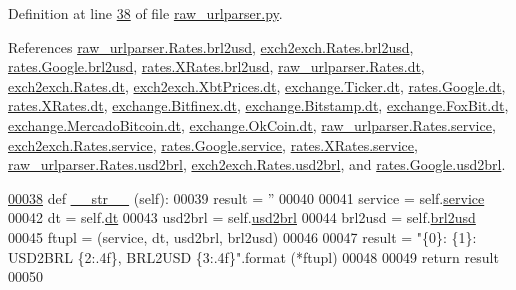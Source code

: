 Definition at line \hyperlink{raw__urlparser_8py_source_l00038}{38} of file \hyperlink{raw__urlparser_8py_source}{raw\+\_\+urlparser.\+py}.



References \hyperlink{raw__urlparser_8py_source_l00026}{raw\+\_\+urlparser.\+Rates.\+brl2usd}, \hyperlink{exch2exch_8py_source_l00030}{exch2exch.\+Rates.\+brl2usd}, \hyperlink{rates_8py_source_l00092}{rates.\+Google.\+brl2usd}, \hyperlink{rates_8py_source_l00147}{rates.\+X\+Rates.\+brl2usd}, \hyperlink{raw__urlparser_8py_source_l00024}{raw\+\_\+urlparser.\+Rates.\+dt}, \hyperlink{exch2exch_8py_source_l00028}{exch2exch.\+Rates.\+dt}, \hyperlink{exch2exch_8py_source_l00057}{exch2exch.\+Xbt\+Prices.\+dt}, \hyperlink{exchange_8py_source_l00057}{exchange.\+Ticker.\+dt}, \hyperlink{rates_8py_source_l00089}{rates.\+Google.\+dt}, \hyperlink{rates_8py_source_l00145}{rates.\+X\+Rates.\+dt}, \hyperlink{exchange_8py_source_l00338}{exchange.\+Bitfinex.\+dt}, \hyperlink{exchange_8py_source_l00407}{exchange.\+Bitstamp.\+dt}, \hyperlink{exchange_8py_source_l00471}{exchange.\+Fox\+Bit.\+dt}, \hyperlink{exchange_8py_source_l00541}{exchange.\+Mercado\+Bitcoin.\+dt}, \hyperlink{exchange_8py_source_l00606}{exchange.\+Ok\+Coin.\+dt}, \hyperlink{raw__urlparser_8py_source_l00027}{raw\+\_\+urlparser.\+Rates.\+service}, \hyperlink{exch2exch_8py_source_l00031}{exch2exch.\+Rates.\+service}, \hyperlink{rates_8py_source_l00094}{rates.\+Google.\+service}, \hyperlink{rates_8py_source_l00149}{rates.\+X\+Rates.\+service}, \hyperlink{raw__urlparser_8py_source_l00025}{raw\+\_\+urlparser.\+Rates.\+usd2brl}, \hyperlink{exch2exch_8py_source_l00029}{exch2exch.\+Rates.\+usd2brl}, and \hyperlink{rates_8py_source_l00091}{rates.\+Google.\+usd2brl}.


\begin{DoxyCode}
\hypertarget{classraw__urlparser_1_1_rates.tex_l00038}{}\hyperlink{classraw__urlparser_1_1_rates_a3e8a9922ba7e95bd54945c87d07e5f0e}{00038}     \textcolor{keyword}{def }\hyperlink{classraw__urlparser_1_1_rates_a3e8a9922ba7e95bd54945c87d07e5f0e}{\_\_str\_\_} (self):
00039         result = \textcolor{stringliteral}{''}
00040 
00041         service = self.\hyperlink{classraw__urlparser_1_1_rates_acb05316e95a39bc42590a882712f854b}{service}
00042         dt      = self.\hyperlink{classraw__urlparser_1_1_rates_a09b3c7cb595f3135c3eda648b1bb4c3f}{dt}
00043         usd2brl = self.\hyperlink{classraw__urlparser_1_1_rates_a52d9b688be8385a87783b27839749b4a}{usd2brl}
00044         brl2usd = self.\hyperlink{classraw__urlparser_1_1_rates_adc9df007bec75344f9f89cb631d1aeb3}{brl2usd}
00045         ftupl = (service, dt, usd2brl, brl2usd)
00046         
00047         result = \textcolor{stringliteral}{"\{0\}: \{1\}: USD2BRL \{2:.4f\}, BRL2USD \{3:.4f\}"}.format (*ftupl)
00048 
00049         \textcolor{keywordflow}{return} result        
00050         
\end{DoxyCode}
